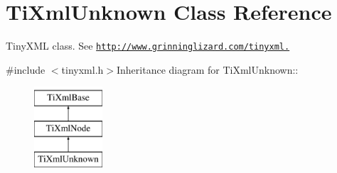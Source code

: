 \hypertarget{class_ti_xml_unknown}{
\section{TiXmlUnknown Class Reference}
\label{class_ti_xml_unknown}
}


TinyXML class. See \href{http://www.grinninglizard.com/tinyxml.}{\tt http://www.grinninglizard.com/tinyxml.}  


{\ttfamily \#include $<$tinyxml.h$>$}Inheritance diagram for TiXmlUnknown::\begin{figure}[H]
\begin{center}
\leavevmode
\includegraphics[height=3cm]{class_ti_xml_unknown}
\end{center}
\end{figure}

